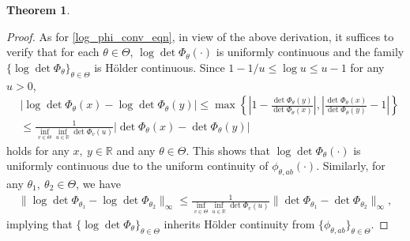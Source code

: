 \documentclass[11pt]{article}
\numberwithin{equation}{section}
\theoremstyle{plain}
\theoremstyle{definition}
\theoremstyle{definition}
\theoremstyle{assumption}
\theoremstyle{proposition}
\theoremstyle{proposition}
\theoremstyle{example}
\theoremstyle{lemma}
\theoremstyle{theorem}
\newtheorem{theorem}{Theorem}[section]
\theoremstyle{remark}
\begin{document}
\begin{theorem}
\begin{proof}
As for \eqref{log_phi_conv_eqn}, in view of the above derivation, it suffices to verify that for each $\theta\in\Theta$, $\log\det\Phi_{\theta}(\cdot)$ is uniformly continuous and the family $\{\log\det\Phi_{\theta}\}_{\theta\in\Theta}$ is H{\"o}lder continuous. Since $1 - 1/u\leqslant\log u \leqslant u - 1$ for any $u > 0$,
\begin{align*}
&|\log\det\Phi_{\theta}(x) - \log\det\Phi_{\theta}(y)| \leqslant \max\left\{\left| 1 - \frac{\det\Phi_{\theta}(y)}{\det\Phi_{\theta}(x)}\right|,\left| \frac{\det\Phi_{\theta}(x)}{\det\Phi_{\theta}(y)} - 1 \right|\right\} \\
&\leqslant \frac{1}{\inf_{v\in\Theta}\inf_{u\in\mathbb{R}}\det\Phi_{v}(u)}|\det\Phi_{\theta}(x) -\det\Phi_{\theta}(y)|
\end{align*}
holds for any $x,~y\in\mathbb{R}$ and any $\theta\in\Theta$. This shows that $\log\det\Phi_{\theta}(\cdot)$ is uniformly continuous due to the uniform continuity of $\phi_{\theta, ab}(\cdot)$. Similarly, for any $\theta_1,~\theta_2\in\Theta$, we have
\begin{align*}
\|\log\det\Phi_{\theta_1} - \log\det\Phi_{\theta_2}\|_{\infty}
\leqslant \frac{1}{\inf_{v\in\Theta}\inf_{u\in\mathbb{R}}\det\Phi_{v}(u)}\|\det\Phi_{\theta_1} -\det\Phi_{\theta_2}\|_{\infty},
\end{align*}
implying that $\{\log\det\Phi_{\theta}\}_{\theta\in\Theta}$ inherits H{\"o}lder continuity from $\{\phi_{\theta, ab}\}_{\theta\in\Theta}$.
\end{proof}
\end{theorem}
\end{document}
